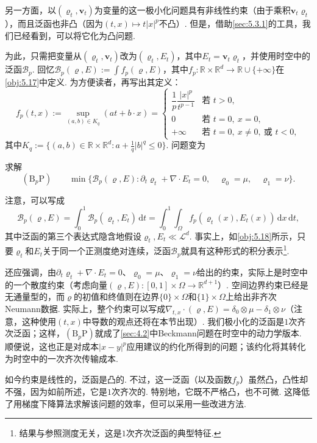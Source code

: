 另一方面，以$(\varrho_t,\mathbf v_t)$为变量的这一极小化问题具有非线性约束（由于乘积$\mathbf v_t\varrho_t$），而且泛函也非凸（因为$(t,x)\mapsto t|x|^p$不凸）. 但是，借助\autoref{sec:5.3.1}的工具，我们已经看到，可以将它化为凸问题.

为此，只需把变量从$(\varrho_t,\mathbf v_t)$改为$(\varrho_t,E_t)$，其中$E_t=\mathbf v_t\varrho_t$，并使用时空中的泛函$\mathscr B_p$. 回忆$\mathscr B_p(\varrho,E):=\int f_p(\varrho,E)$，其中$f_p:\mathbb R\times\mathbb R^d\to\mathbb R\cup\{+\infty\}$在\autoref{obj:5.17}中定义. 为方便读者，再写出其定义：
\[
f_p(t,x):=\sup_{(a,b)\in K_q}(at+b\cdot x)=
\begin{cases}
\dfrac1p\dfrac{|x|^p}{t^{p-1}}&\text{若 }t>0,\\
0&\text{若 }t=0,\ x=0,\\
+\infty&\text{若 }t=0,\ x\ne0,\ \text{或 }t<0,
\end{cases}
\]
其中$K_q:=\{(a,b)\in\mathbb R\times\mathbb R^d:a+\frac1q|b|^q\le0\}$. 问题变为
\begin{problem}\label{obj:6.1}
求解
\[
(\mathrm B_p\mathrm P)\qquad
\min\{\mathscr B_p(\varrho,E):\partial_t\varrho_t+\nabla\cdot E_t=0,\quad
\varrho_0=\mu,\quad\varrho_1=\nu\}.
\]
\end{problem}
注意，可以写成
\[
\mathscr B_p(\varrho,E)
=\int_0^1\mathscr B_p(\varrho_t,E_t)\,\mathrm dt
=\int_0^1\int_\Omega f_p(\varrho_t(x),E_t(x))\,\mathrm dx\,\mathrm dt,
\]
其中泛函的第三个表达式隐含地假设$\varrho_t,E_t\ll\mathscr L^d$. 事实上，如\autoref{obj:5.18}所示，只要$\varrho_t$和$E_t$关于同一个正测度绝对连续，泛函$\mathscr B_p$就具有这种形式的积分表示\footnote{结果与参照测度无关，这是$1$次齐次泛函的典型特征.}.

还应强调，由$\partial_t\varrho_t+\nabla\cdot E_t=0$、$\varrho_0=\mu$、$\varrho_1=\nu$给出的约束，实际上是时空中的一个散度约束（考虑向量$(\varrho,E):[0,1]\times\Omega\to\mathbb R^{d+1}$）. 空间边界约束已经是无通量型的，而$\varrho$的初值和终值则在边界$\{0\}\times\Omega$和$\{1\}\times\Omega$上给出非齐次Neumann数据. 实际上，整个约束可以写成$\nabla_{t,x}\cdot(\varrho,E)=\delta_0\otimes\mu-\delta_1\otimes\nu$（注意，这种使用$(t,x)$中导数的观点还将在本节出现）. 我们极小化的泛函是$1$次齐次泛函；这样，$(\mathrm B_p\mathrm P)$就成了\autoref{sec:4.2}中Beckmann问题在时空中的动力学版本. 顺便说，这也正是对成本$|x-y|^p$应用\cite{b196}建议的约化所得到的问题；该约化将其转化为时空中的一次齐次传输成本.

如今约束是线性的，泛函是凸的. 不过，这一泛函（以及函数$f_p$）虽然凸，凸性却不强，因为如前所述，它是$1$次齐次的. 特别地，它既不严格凸，也不可微. 这降低了用梯度下降算法求解该问题的效率，但可以采用一些改进方法.

